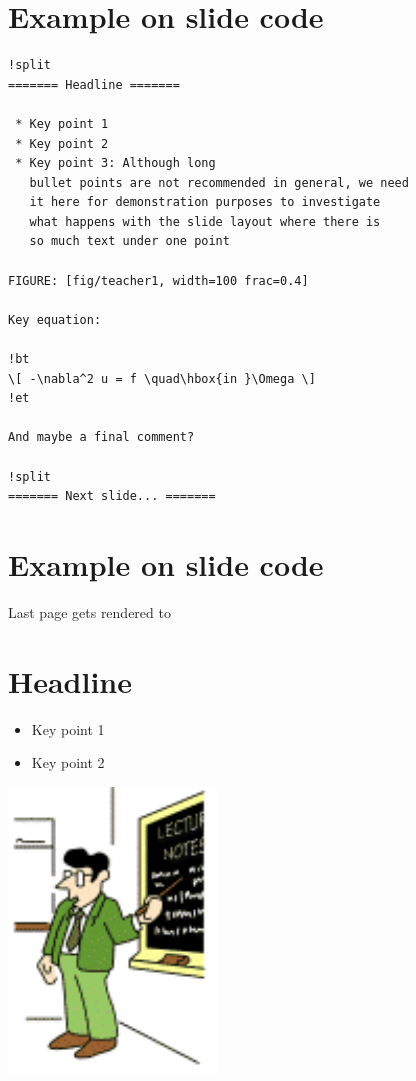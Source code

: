\documentclass[%
twoside,                 %
final,                   %
chapterprefix=true,      %
open=right               %
10pt]{book}
\begin{document}
\noindent
\section*{Example on slide code}

\begin{Verbatim}[numbers=none,fontsize=\fontsize{9pt}{9pt},baselinestretch=0.95]
!split
======= Headline =======

 * Key point 1
 * Key point 2
 * Key point 3: Although long
   bullet points are not recommended in general, we need
   it here for demonstration purposes to investigate
   what happens with the slide layout where there is
   so much text under one point

FIGURE: [fig/teacher1, width=100 frac=0.4]

Key equation:

!bt
\[ -\nabla^2 u = f \quad\hbox{in }\Omega \]
!et

And maybe a final comment?

!split
======= Next slide... =======
\end{Verbatim}

\section*{Example on slide code}

Last page gets rendered to

\section*{Headline}

\begin{itemize}
 \item Key point 1

 \item Key point 2
\end{itemize}

\noindent
\begin{center}  %
  \centerline{\includegraphics[width=0.4\linewidth]{fig/teacher1.pdf}}
\end{center}
\end{document}
